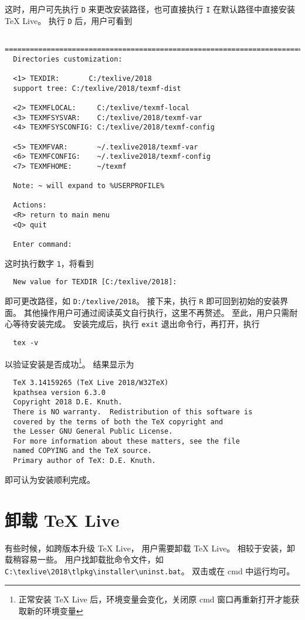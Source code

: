 \documentclass{ctexart}
\begin{document}
这时，用户可先执行 \texttt{D} 来更改安装路径，也可直接执行 \texttt{I} 在默认路径中直接安装 \TeX{} Live。
执行 \texttt{D} 后，用户可看到
\begin{lstlisting}
  ==============================================================================
  Directories customization:
  
  <1> TEXDIR:       C:/texlive/2018
  support tree: C:/texlive/2018/texmf-dist
  
  <2> TEXMFLOCAL:     C:/texlive/texmf-local
  <3> TEXMFSYSVAR:    C:/texlive/2018/texmf-var
  <4> TEXMFSYSCONFIG: C:/texlive/2018/texmf-config
  
  <5> TEXMFVAR:       ~/.texlive2018/texmf-var
  <6> TEXMFCONFIG:    ~/.texlive2018/texmf-config
  <7> TEXMFHOME:      ~/texmf
  
  Note: ~ will expand to %USERPROFILE%
  
  Actions:
  <R> return to main menu
  <Q> quit
  
  Enter command:
\end{lstlisting}
这时执行数字 \texttt{1}，将看到
\begin{lstlisting}
  New value for TEXDIR [C:/texlive/2018]:
\end{lstlisting}
即可更改路径，如 \texttt{D:/texlive/2018}。
接下来，执行 \texttt{R} 即可回到初始的安装界面。
其他操作用户可通过阅读英文自行执行，这里不再赘述。
至此，用户只需耐心等待安装完成。
安装完成后，执行 \texttt{exit} 退出命令行，再打开，执行
\begin{lstlisting}
  tex -v
\end{lstlisting}
以验证安装是否成功\footnote{正常安装 \TeX{} Live 后，环境变量会变化，关闭原 \textsf{cmd} 窗口再重新打开才能获取新的环境变量}。
结果显示为
\begin{lstlisting}
  TeX 3.14159265 (TeX Live 2018/W32TeX)
  kpathsea version 6.3.0
  Copyright 2018 D.E. Knuth.
  There is NO warranty.  Redistribution of this software is
  covered by the terms of both the TeX copyright and
  the Lesser GNU General Public License.
  For more information about these matters, see the file
  named COPYING and the TeX source.
  Primary author of TeX: D.E. Knuth.
\end{lstlisting}
即可认为安装顺利完成。

\section{卸载 \TeX{} Live}
有些时候，如跨版本升级 \TeX{} Live， 用户需要卸载 \TeX{} Live。
相较于安装，卸载稍容易一些。
用户找卸载批命令文件，如 \texttt{C:\textbackslash texlive\textbackslash 2018\textbackslash tlpkg\textbackslash installer\textbackslash uninst.bat}。
双击或在 \textsf{cmd} 中运行均可。
\end{document}
